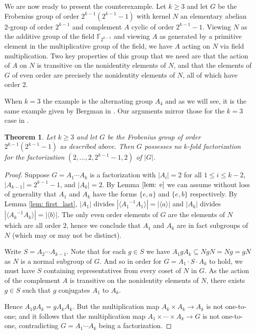 \documentclass{amsart}
\newtheorem{theorem}{Theorem}[section]
\begin{document}
We are now ready to present the counterexample.  Let $k \geq 3$ and let $G$ be the Frobenius group of order $2^{k-1}(2^{k-1}-1)$ with kernel $N$ an elementary abelian $2$-group of order $2^{k-1}$ and complement $A$ cyclic of order $2^{k-1}-1$.  Viewing $N$ as the additive group of the field $\mathbb{F}_{2^{k-1}}$ and viewing $A$ as generated by a primitive element in the multiplicative group of the field, we have $A$ acting on $N$ via field multiplication.  Two key properties of this group that we need are that the action of $A$ on $N$ is transitive on the nonidentity elements of $N$, and that the elements of $G$ of even order are precisely the nonidentity elements of $N$, all of which have order $2$.

When $k=3$ the example is the alternating group $A_4$ and as we will see, it is the same example given by Bergman in \cite{berg}.  Our arguments mirror those for the $k=3$ case in \cite{berg}.

\begin{theorem}\label{thm1}
Let $k \geq 3$ and let $G$ be the Frobenius group of order $2^{k-1}(2^{k-1}-1)$ as described above.  Then $G$ possesses no $k$-fold factorization for the factorization $(2,\dots,2,2^{k-1}-1,2)$ of $|G|$.
\end{theorem}

\begin{proof}
Suppose $G = A_1 \cdots A_k$ is a factorization with $|A_i|=2$ for all $1 \leq i \leq k-2$, $|A_{k-1}| = 2^{k-1} - 1$, and $|A_k| = 2$.  By Lemma $\ref{lem: e}$ we can assume without loss of generality that $A_1$ and $A_k$ have the forms $\{e,a\}$ and $\{e,b\}$ respectively.  By Lemma \ref{lem: first_last}, $|A_1|$ divides $|\langle {A_1}^{-1}A_1 \rangle| = |\langle a \rangle|$ and $|A_k|$ divides $|\langle {A_k}^{-1}A_k \rangle| = |\langle b \rangle|$.  The only even order elements of $G$ are the elements of $N$ which are all order $2$, hence we conclude that $A_1$ and $A_k$ are in fact subgroups of $N$ (which may or may not be distinct).

Write $S = A_2 \cdots A_{k-1}$.  Note that for each $g \in S$ we have $A_1gA_k \subseteq NgN = Ng = gN$ as $N$ is a normal subgroup of $G$.  And so in order for $G = A_1 \cdot S \cdot A_k$ to hold, we must have $S$ containing representatives from every coset of $N$ in $G$.  As the action of the complement $A$ is transitive on the nonidentity elements of $N$, there exists $g \in S$ such that $g$ conjugates $A_1$ to $A_k$.

Hence $A_1 g A_k = g A_k A_k$.  But the multiplication map $A_k \times A_k \rightarrow A_k$ is not one-to-one; and it follows that the multiplication map $A_1 \times \cdots \times A_k \rightarrow G$ is not one-to-one, contradicting $G = A_1 \cdots A_k$ being a factorization.
\end{proof}
\end{document}
